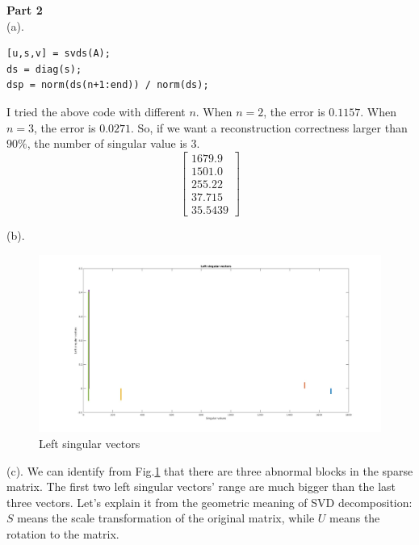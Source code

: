 \documentclass[11pt]{article}
\begin{document}
\noindent
\textbf{Part 2} \\
(a). %
\begin{verbatim}
[u,s,v] = svds(A);
ds = diag(s);
dsp = norm(ds(n+1:end)) / norm(ds);
\end{verbatim}
I tried the above code with different $n$. When $n = 2$, the error is $0.1157$. When $n = 3$, the error is $0.0271$. So, if we want a reconstruction correctness larger than $90\%$, the number of singular value is 3.
$$
\begin{bmatrix} 
    1679.9  \\
    1501.0  \\ 
    255.22  \\
    37.715  \\
    35.5439
\end{bmatrix}
$$

\noindent
(b). 
\begin{figure}[!h]
    \centering
    \includegraphics[width=\linewidth]{figs/q3.jpg}
    \caption{Left singular vectors}
    \label{fig::vec}
\end{figure}

\noindent
(c). We can identify from Fig.\ref{fig::vec} that there are three abnormal blocks in the sparse matrix. The first two left singular vectors' range are much bigger than the last three vectors. Let's explain it from the geometric meaning of SVD decomposition: $S$ means the scale transformation of the original matrix, while $U$ means the rotation to the matrix. 
\end{document}
